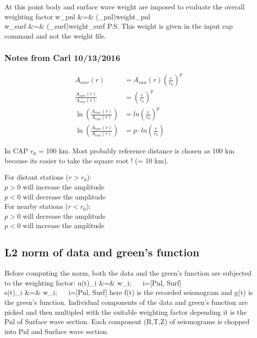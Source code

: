 \documentclass[11pt,titlepage,fleqn]{article}
\begin{document}
At this point body and surface wave weight are imposed to evaluate the overall weighting factor
\eqa
w_{pnl}  &=& (\mu_{pnl})\times weight_{pnl}\\
w_{surf} &=& (\mu_{surf})\times weight_{surf}
\ena
P.S. This weight is given in the input cap command and not the weight file.

\subsubsection*{Notes from Carl 10/13/2016}
\begin{align*}
A_{corr}(r) &= A_{raw}(r) \left( \frac{r}{r_0} \right)^p \\
\frac{A_{corr}(r)}{A_{raw}(r)} &= \left( \frac{r}{r_0} \right)^p \\
\ln \left(\frac{A_{corr}(r)}{A_{raw}(r)} \right) &= ln \left( \frac{r}{r_0} \right)^p \\
\ln \left(\frac{A_{corr}(r)}{A_{raw}(r)} \right) &= p \cdot ln \left( \frac{r}{r_0} \right)
\end{align*}

In CAP $r_0$ = 100 km. Most probably reference distance is chosen as 100 km because its easier to take the square root ! (= 10 km).

For distant stations ($r > r_0$):\\
$p > 0$ will increase the amplitude\\
$p < 0$ will decrease the amplitude\\
For nearby stations ($r < r_0$):\\
$p > 0$ will decrease the amplitude\\
$p < 0$ will increase the amplitude\\

\subsection{L2 norm of data and green's function}
Before computing the norm, both the data and the green's function are subjected to the weighting factor:
\eqa
u(t)_i &=& w_i\times[f(t)_i];\,\,\,\,\,\,\,\,\,\,i=[Pnl, Surf]\\
s(t)_i &=& w_i\times[g(t)_i];\,\,\,\,\,\,\,\,\,\,i=[Pnl, Surf]
\ena
here f(t) is the recorded seismogram and g(t) is the green's function. Individual components of the data and green's function are picked and then multipled with the suitable weighting factor depending it is the Pnl of Surface wave section. Each component (R,T,Z) of seismograms is chopped into Pnl and Surface wave section.
\end{document}
